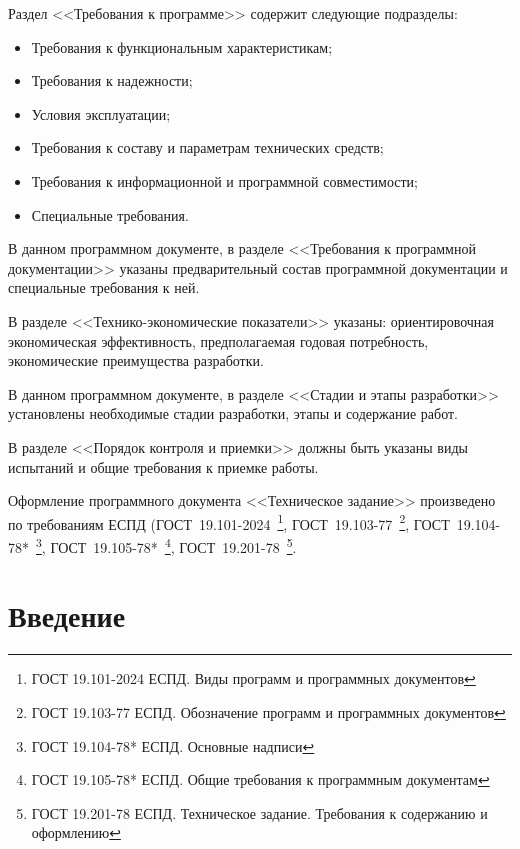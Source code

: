 \documentclass[14pt,a4paper,final]{extreport}
\begin{document}
Раздел <<Требования к программе>> содержит следующие подразделы:
\begin{itemize}
	\item Требования к функциональным характеристикам;
	\item Требования к надежности;
	\item Условия эксплуатации;
	\item Требования к составу и параметрам технических средств;
	\item Требования к информационной и программной совместимости;
	\item Специальные требования.
\end{itemize}

В данном программном документе, в разделе <<Требования к программной документации>> указаны предварительный состав программной документации и специальные требования к ней.

В разделе <<Технико-экономические показатели>> указаны: ориентировочная экономическая эффективность, предполагаемая годовая потребность, экономические преимущества разработки.

В данном программном документе, в разделе <<Стадии и этапы разработки>> установлены необходимые стадии разработки, этапы и содержание работ.

В разделе <<Порядок контроля и приемки>> должны быть указаны виды испытаний и общие требования к приемке работы.

Оформление программного документа <<Техническое задание>> произведено по требованиям ЕСПД (ГОСТ~19.101-2024~\footnote{ГОСТ 19.101-2024 ЕСПД. Виды программ и программных документов}, 
ГОСТ~19.103-77~\footnote{ГОСТ 19.103-77 ЕСПД. Обозначение программ и программных документов}, 
ГОСТ~19.104-78*~\footnote{ГОСТ 19.104-78* ЕСПД. Основные надписи}, 
ГОСТ~19.105-78*~\footnote{ГОСТ 19.105-78* ЕСПД. Общие требования к программным документам},
ГОСТ~19.201-78~\footnote{ГОСТ 19.201-78 ЕСПД. Техническое задание. Требования к содержанию и оформлению}.

\pagebreak


\tableofcontents

\pagebreak

\chapter{Введение}
\end{document}

